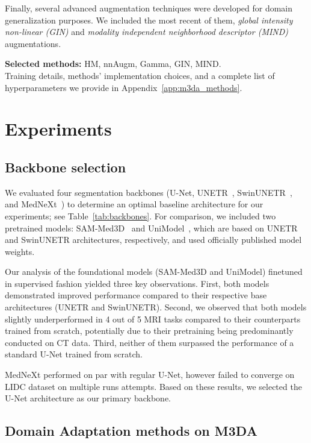 Finally, several advanced augmentation techniques were developed for domain generalization purposes. We included the most recent of them, \textit{global intensity non-linear (GIN)} \cite{gin} and \textit{modality independent neighborhood descriptor (MIND)} \cite{dg_tta} augmentations.

\textbf{Selected methods:} HM, nnAugm, Gamma, GIN, MIND.\\

Training details, methods' implementation choices, and a complete list of hyperparameters we provide in Appendix~\ref{app:m3da_methods}.


\section{Experiments}


\subsection{Backbone selection}

We evaluated four segmentation backbones (U-Net, UNETR~\cite{unetr}, SwinUNETR~\cite{swinunetr}, and MedNeXt~\cite{mednext}) to determine an optimal baseline architecture for our experiments; see Table~\ref{tab:backbones}. For comparison, we included two pretrained models: SAM-Med3D~\cite{sammed} and UniModel~\cite{unimodel}, which are based on UNETR and SwinUNETR architectures, respectively, and used officially published model weights.



Our analysis of the foundational models (SAM-Med3D and UniModel) finetuned in supervised fashion yielded three key observations. First, both models demonstrated improved performance compared to their respective base architectures (UNETR and SwinUNETR). Second, we observed that both models slightly underperformed in 4 out of 5 MRI tasks compared to their counterparts trained from scratch, potentially due to their pretraining being predominantly conducted on CT data. Third, neither of them surpassed the performance of a standard U-Net trained from scratch.

MedNeXt performed on par with regular U-Net, however failed to converge on LIDC dataset on multiple runs attempts. %
Based on these results, we selected the U-Net architecture as our primary backbone.


\subsection{Domain Adaptation methods on M3DA}

